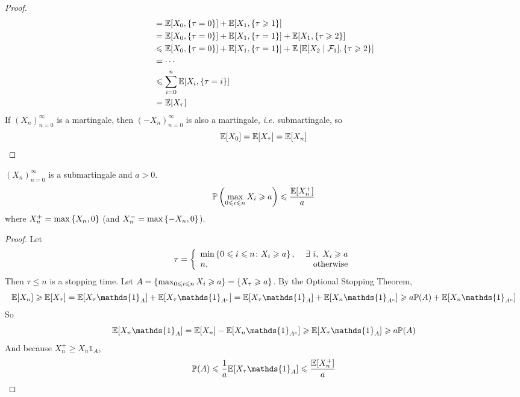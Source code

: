 \documentclass[a4paper,12pt]{article}
\begin{document}
\begin{itemize}
\begin{proof}
\begin{equation*}
\begin{split}
        &= \mathbb{E}[X_0, \left\{\tau = 0\right\}] + \mathbb{E}[X_1, \left\{\tau \geqslant 1\right\}] \\
        &= \mathbb{E}[X_0, \left\{\tau = 0\right\}] + \mathbb{E}[X_1, \left\{\tau = 1\right\}] + \mathbb{E}[X_1, \left\{\tau \geqslant 2\right\}] \\
        &\leqslant \mathbb{E}[X_0, \left\{\tau = 0\right\}] + \mathbb{E}[X_1, \left\{\tau = 1\right\}] + \mathbb{E}\left[\mathbb{E}[X_2\mid \mathcal{F}_1], \left\{\tau \geqslant 2\right\}\right] \\
        &= \cdots \\
        &\leqslant \sum_{i=0}^n \mathbb{E}[X_i, \left\{\tau = i\right\}] \\
        &= \mathbb{E}[X_{\tau}]
      \end{split}
    \end{equation*}
    If $(X_n)_{n=0}^{\infty}$ is a martingale, then $(-X_n)_{n=0}^{\infty}$ is also a martingale, \emph{i.e.} submartingale, so
    \begin{equation*}
      \mathbb{E}[X_0] = \mathbb{E}[X_{\tau}] = \mathbb{E}[X_n]
    \end{equation*}
  \end{proof}

  \begin{thm}
    $(X_n)_{n=0}^{\infty}$ is a submartingale and $a > 0$.
    \begin{equation*}
      \mathbb{P}\left(\max_{0\leqslant i \leqslant n}X_i \geqslant a\right) \leqslant \frac{\mathbb{E}[X_n^+]}{a}
    \end{equation*}
    where $X_n^+ = \max\left\{X_n, 0\right\}$ (and $X_n^- = \max\left\{-X_n,0\right\}$).
  \end{thm}
  \begin{proof}
    Let 
    \begin{equation*}
      \tau = \left\{
        \begin{array}{lr}
          \min\left\{0\leqslant i \leqslant n \colon X_i \geqslant a\right\},&~\exists~i,~X_i \geqslant a \\
          n,&~\text{otherwise}
        \end{array}
      \right.
    \end{equation*}
    Then $\tau \leqslant n$ is a stopping time. Let $A = \left\{\max_{0\leqslant i \leqslant n}X_i \geqslant a\right\}=\left\{X_{\tau} \geqslant a\right\}$. By the Optional Stopping Theorem,
    \begin{equation*}
      \E[X_n] \geqslant \E[X_{\tau}] = \E[X_{\tau}\mathds{1}_A] + \E[X_{\tau}\mathds{1}_{A^c}] = \E[X_{\tau}\mathds{1}_A] + \E[X_{n}\mathds{1}_{A^c}] \geqslant a\Pb(A) + \E[X_{n}\mathds{1}_{A^c}]
    \end{equation*}
    So
    \begin{equation*}
      \E[X_n\mathds{1}_{A}]= \E[X_n] - \E[X_{n}\mathds{1}_{A^c}] \geqslant \E[X_{\tau}\mathds{1}_A] \geqslant a\Pb(A)
    \end{equation*}
    And because $X_n^+ \geqslant X_n\mathds{1}_{A}$,
    \begin{equation*}
      \Pb(A) \leqslant \frac{1}{a}\E[X_{\tau}\mathds{1}_A] \leqslant \frac{\E[X_n^+]}{a}
    \end{equation*}
  \end{proof}


\end{itemize}
\end{document}
